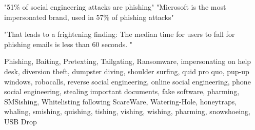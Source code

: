 "51\% of social engineering attacks are phishing"\cite{3_barracuda}
"Microsoft is the most impersonated brand, used in 57\% of phishing attacks"\cite{3_barracuda}

"That leads to a frightening
finding: The median time for
users to fall for phishing emails
is less than 60 seconds. "\cite{verizon2024}

Phishing, Baiting, Pretexting, Tailgating, Ransomware, impersonating on help desk, diversion theft, dumpster diving,
shoulder surfing, quid pro quo, pup-up windows, robocalls, reverse social engineering, online social engineering, phone social engineering,
stealing important documents, fake software, pharming, SMSishing, Whitelisting following
ScareWare, Watering-Hole, honeytraps, whaling, smishing, quishing, tishing, vishing, wishing, pharming, snowshoeing, USB Drop


